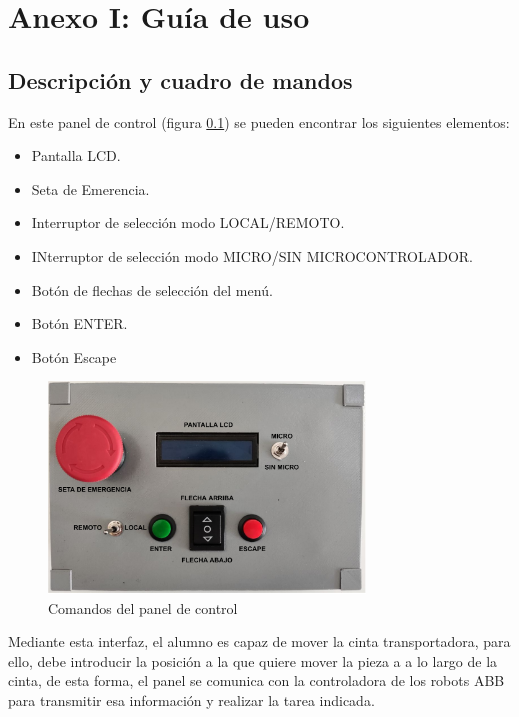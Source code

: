 \chapter*{Anexo I: Guía de uso}\label{Anexo}
\pagestyle{especial}
{}

\section{Descripción y cuadro de mandos}

En este panel de control (figura \ref{fig:interfazhmireal}) se pueden encontrar los siguientes elementos:

\begin{itemize}
    \item Pantalla LCD.
    \item Seta de Emerencia.
    \item Interruptor de selección modo LOCAL/REMOTO.
    \item INterruptor de selección modo MICRO/SIN MICROCONTROLADOR.
    \item Botón de flechas de selección del menú.
    \item Botón ENTER.
    \item Botón Escape
\end{itemize}

\begin{figure}[htbp]
	\centering
	\includegraphics[width=0.75\textwidth]{09-guiadeuso/HMI_REAL.pdf}
	\caption{Comandos del panel de control}
	\label{fig:interfazhmireal}
	\end{figure}

Mediante esta interfaz, el alumno es capaz de mover la cinta transportadora, para ello, debe introducir la posición a la que quiere mover la pieza a a lo largo de la cinta, de esta forma, el panel se comunica con la controladora de los robots ABB para transmitir esa información y realizar la tarea indicada.


